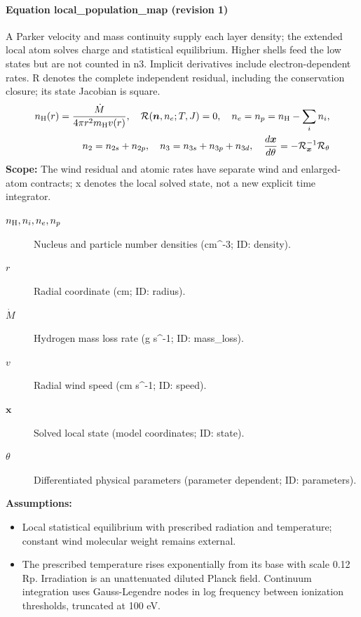 
\paragraph{Equation local\_population\_map (revision 1)}
A Parker velocity and mass continuity supply each layer density; the extended local atom solves charge and statistical equilibrium. Higher shells feed the low states but are not counted in n3. Implicit derivatives include electron-dependent rates. R denotes the complete independent residual, including the conservation closure; its state Jacobian is square.
\begin{equation}
\begin{aligned}
n_{\rm H}(r)=\frac{\dot M}{4\pi r^2m_{\rm H}v(r)},\quad \mathcal R(\boldsymbol n,n_e;T,J)=0,\quad n_e=n_p=n_{\rm H}-\sum_i n_i,\\ n_2=n_{2s}+n_{2p},\quad n_3=n_{3s}+n_{3p}+n_{3d},\quad \frac{d\boldsymbol x}{d\theta}=-\mathcal R_{\boldsymbol x}^{-1}\mathcal R_\theta
\end{aligned}
\label{eq:escape.nlte_5f_spectrum:local_5f_population_5f_map:1}
\end{equation}
\noindent\textbf{Scope:} The wind residual and atomic rates have separate wind and enlarged-atom contracts; x denotes the local solved state, not a new explicit time integrator.

\begin{description}
\item[$n_{\rm H},n_i,n_e,n_p$] Nucleus and particle number densities (cm\textasciicircum{}-3; ID: density).
\item[$r$] Radial coordinate (cm; ID: radius).
\item[$\dot M$] Hydrogen mass loss rate (g s\textasciicircum{}-1; ID: mass\_loss).
\item[$v$] Radial wind speed (cm s\textasciicircum{}-1; ID: speed).
\item[$\boldsymbol x$] Solved local state (model coordinates; ID: state).
\item[$\theta$] Differentiated physical parameters (parameter dependent; ID: parameters).
\end{description}

\noindent\textbf{Assumptions:}
\begin{itemize}
\item Local statistical equilibrium with prescribed radiation and temperature; constant wind molecular weight remains external.
\item The prescribed temperature rises exponentially from its base with scale 0.12 Rp. Irradiation is an unattenuated diluted Planck field. Continuum integration uses Gauss-Legendre nodes in log frequency between ionization thresholds, truncated at 100 eV.
\end{itemize}

